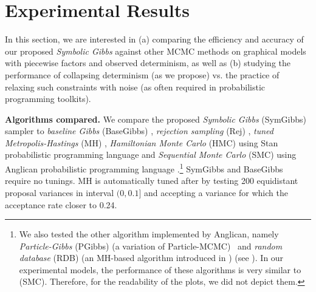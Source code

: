 \documentclass{article} %
\begin{document}
\section{Experimental Results}
\label{sect:experimental.results}
In this section, we are interested in (a) comparing the efficiency and accuracy of our proposed \emph{Symbolic Gibbs} against other MCMC methods on graphical models with piecewise factors and observed determinism, as well as 
(b) studying the performance of collapsing determinism (as we propose) vs. the practice of relaxing such constraints with noise
(as often required in probabilistic programming toolkits). 
%

{\bf Algorithms compared.} 
We compare the proposed \emph{Symbolic Gibbs} (SymGibbs) sampler to
\emph{baseline Gibbs} (BaseGibbs) \cite{pearl1987evidential},
\emph{rejection sampling} (Rej) \cite{hammersley1964monte}, 
\emph{tuned Metropolis-Hastings} (MH) \cite{roberts1997weak}, 
\emph{Hamiltonian Monte Carlo} (HMC) using Stan probabilistic programming language  \cite{stan-manual:2014}
and \emph{Sequential Monte Carlo} (SMC) using Anglican probabilistic programming language \cite{wood2014new}.\footnote{
We also tested the other algorithm implemented by Anglican, namely 
\emph{Particle-Gibbs} (PGibbs) (a variation of Particle-MCMC\cite{andrieu2010particle}) \
and \emph{random database} (RDB) (an MH-based algorithm introduced in \cite{wingate2011lightweight}) (see \cite{wood2014new}).
In our experimental models, the performance of these algorithms is very similar to (SMC).
Therefore, for the readability of the plots, we did not depict them.
}
SymGibbs and BaseGibbs require no tunings. 
MH is automatically tuned after \cite{roberts1997weak} by testing 200 equidistant proposal variances in interval 
$(0, 0.1]$ and accepting a variance for which the acceptance rate closer to 0.24.
\end{document}

